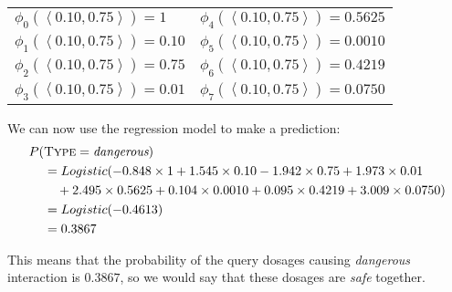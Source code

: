 \documentclass[--SOLUTION-OPTION--]{ditpaper}
\begin{document}
\begin{enumerate}
\begin{answer}
			\begin{center}
\begin{tabular}[ht]{ l  l  }
$\phi_0(\left<0.10, 0.75\right>) =  1$ & $\phi_4(\left<0.10, 0.75\right>) = 0.5625$ \\
$\phi_1(\left<0.10, 0.75\right>) = 0.10$ & $\phi_5(\left<0.10, 0.75\right>) = 0.0010$ \\
$\phi_2(\left<0.10, 0.75\right>) = 0.75$ &$\phi_6(\left<0.10, 0.75\right>) = 0.4219$  \\
$\phi_3(\left<0.10, 0.75\right>) = 0.01$ & $\phi_7(\left<0.10, 0.75\right>) = 0.0750$ \\
\end{tabular}
\end{center}
	We can now use the regression model to make a prediction:
		\begin{alignat*}{2}				
P(&\textsc{Type}=\textit{dangerous}) \\
&= Logistic(-0.848\times 1 + 1.545 \times 0.10  -1.942 \times0.75 + 1.973 \times 0.01 \\
& ~~~   +  2.495   \times 0.5625 + 0.104 \times 0.0010 + 0.095 \times 0.4219 + 3.009\times 0.0750) \\
& =  Logistic(-0.4613)  \\
& = 0.3867 
\end{alignat*}
 
\noindent This means that the probability of the query dosages causing \textit{dangerous} interaction is $0.3867$, so we would say that these dosages are \textit{safe} together. 
%
% 


\end{answer}
\end{enumerate}
\end{document}
